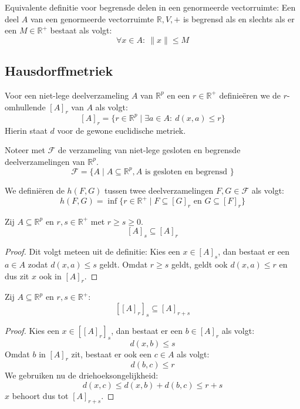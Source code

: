 \documentclass[main.tex]{subfiles}
\begin{document}
\begin{st}
  Equivalente definitie voor begrensde delen in een genormeerde vectorruimte:
  Een deel $A$ van een genormeerde vectorruimte $\mathbb{R},V,+$ is begrensd als en slechts als er een $M \in \mathbb{R}^{+}$ bestaat als volgt:
  \[ \forall x\in A:\ \|x\| \le M \]
\end{st}

\subsection{Hausdorffmetriek}
\label{sec:hausdorffmetriek}

\begin{de}
  Voor een niet-lege deelverzameling $A$ van $\mathbb{R}^{p}$ en een $r\in \mathbb{R}^{+}$ definie\"eren we de $r$-omhullende $[A]_{r}$ van $A$ als volgt:
  \[ [A]_{r} = \{r \in \mathbb{R}^{p} \mid \exists a \in A:\ d(x,a) \le r \} \]
  Hierin staat $d$ voor de gewone euclidische metriek.
\end{de}

\begin{de}
  Noteer met $\mathcal{F}$ de verzameling van niet-lege gesloten en begrensde deelverzamelingen van $\mathbb{R}^{p}$.
  \[ \mathcal{F} = \{ A \mid A \subseteq \mathbb{R}^{p}, A \text{ is gesloten en begrensd } \} \]
\end{de}

\begin{de}
  We defini\"eren de  $h(F,G)$ tussen twee deelverzamelingen $F,G \in \mathcal{F}$ als volgt:
  \[ h(F,G) = \inf\{ r\in \mathbb{R}^{+} \mid F \subseteq [G]_{r} \text{ en } G \subseteq [F]_{r} \} \]
\end{de}

\begin{blem}
  \label{lem:omhullenden-in-elkaar}
  Zij $A \subseteq \mathbb{R}^{p}$ en $r,s\in\mathbb{R}^{+}$ met $r\ge s \ge 0$.
  \[ [A]_{s} \subseteq [A]_{r} \]

  \begin{proof}
    Dit volgt meteen uit de definitie:
    Kies een $x\in [A]_{s}$, dan bestaat er een $a\in A$ zodat $d(x,a) \le s$ geldt.
    Omdat $r \ge s$ geldt, geldt ook $d(x,a) \le r$ en dus zit $x$ ook in $[A]_{r}$.
  \end{proof}
\end{blem}

\begin{blem}
  Zij $A \subseteq \mathbb{R}^{p}$ en $r,s\in\mathbb{R}^{+}$:
  \[ \left[ [A]_{r}\right]_{s} \subseteq [A]_{r+s} \]

  \begin{proof}
    Kies een $x\in \left[[A]_{r}\right]_{s}$, dan bestaat er een $b\in [A]_{r}$ als volgt:
    \[ d(x,b) \le s \]
    Omdat $b$ in $[A]_{r}$ zit, bestaat er ook een $c\in A$ als volgt:
    \[ d(b,c) \le r \]
    We gebruiken nu de driehoeksongelijkheid:
    \[ d(x,c) \le d(x,b) + d(b,c) \le r + s \]
    $x$ behoort dus tot $[A]_{r+s}$.
  \end{proof}
\end{blem}
\end{document}
